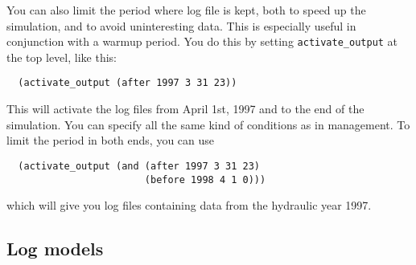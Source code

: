 \documentclass[a4paper,11pt]{article}
\begin{document}
You can also limit the period where log file is kept, both to speed up
the simulation, and to avoid uninteresting data.  This is
especially useful in conjunction with a warmup period.  You do this by
setting \texttt{activate\_output} at the top level, like this:
\begin{verbatim}
  (activate_output (after 1997 3 31 23))
\end{verbatim}
This will activate the log files from April 1st, 1997 and to the end
of the simulation.  You can specify all the same kind of conditions as
in management.  To limit the period in both ends, you can use
\begin{verbatim}
  (activate_output (and (after 1997 3 31 23) 
                        (before 1998 4 1 0)))
\end{verbatim}
which will give you log files containing data from the hydraulic year
1997. 

\subsection{Log models}
\label{sec:log-models}
\end{document}
